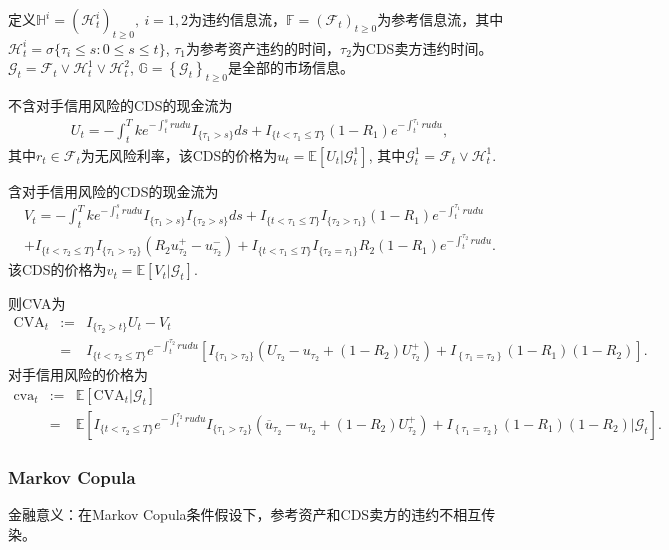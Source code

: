 \documentclass{article}
\begin{document}
  定义$\mathbb{H}^i = (\mathcal{H}_t^i)_{t\ge0},\ i =1,2$为违约信息流，$\mathbb{F} = (\mathcal{F}_t)_{t\ge0}$为参考信息流，其中$\mathcal{H}_t^i = \sigma\{\tau_i\le s:0\le s\le t\}$, $\tau_1$为参考资产违约的时间，$\tau_2$为CDS卖方违约时间。$\mathcal{G}_t = \mathcal{F}_t\vee \mathcal{H}^1_t\vee \mathcal{H}^2_t$, $\mathbb{G} = \left\{\mathcal{G}_t\right\}_{t\ge 0}$是全部的市场信息。
  
  
  不含对手信用风险的CDS的现金流为
\begin{eqnarray}
  U_t = -\int_t^Tke^{-\int_t^srudu} I_{\{\tau_1>s\}}ds +I_{\{t<\tau_1\le T\}}(1-R_1)e^{-\int_t^{\tau_1}rudu},
\end{eqnarray}
其中$r_t\in \mathcal{F}_t$为无风险利率，该CDS的价格为$u_ t = \mathbb{E}[U_t |\mathcal{G}_t^1]$, 其中$\mathcal{G}_t^1 = \mathcal{F}_t\vee \mathcal{H}^1_t$.

  含对手信用风险的CDS的现金流为
  \begin{eqnarray}
    V_t = -\int_t^Tke^{-\int_t^srudu} I_{\{\tau_1>s\}}I_{\{\tau_2>s\}}ds + I_{\{t<\tau_1\le T\}}I_{\{\tau_2>\tau_1\}}(1-R_1)e^{-\int_t^{\tau_1}rudu} \\ + I_{\{t<\tau_2\le T\}}I_{\{\tau_1>\tau_2\}}\left(R_2 u_{\tau_2}^+ -  u_{\tau_2}^-\right) +I_{\{t<\tau_1\le T\}}I_{\{\tau_2=\tau_1\}}R_2(1-R_1)e^{-\int_t^{\tau_2}rudu}.
  \end{eqnarray}
该CDS的价格为$v_ t = \mathbb{E}[V_t |\mathcal{G}_t]$. 

则CVA为
\begin{eqnarray*}
  \text{CVA}_t&:=&I_{\{\tau_2>t\}}U_t - V_t \\
&=& I_{\{t<\tau_2\le T\}}e^{-\int_t^{\tau_2}rudu}\left[I_{\{\tau_1>\tau_2\}}\left(U_{\tau_2} - u_{\tau_2}+(1-R_2)U_{\tau_2}^+\right)+ I_{\left\{\tau_1=\tau_2\right\}}(1-R_1)(1-R_2)\right].
\end{eqnarray*}
对手信用风险的价格为
\begin{eqnarray*}
  \text{cva}_t&:=&\mathbb{E}\left[ \text{CVA}_t |\mathcal{G}_t\right] \\
&=& \mathbb{E} \left[I_{\{t<\tau_2\le T\}}e^{-\int_t^{\tau_2}rudu}I_{\{\tau_1>\tau_2\}}\left(\overline{u}_{\tau_2} - u_{\tau_2}+(1-R_2)U_{\tau_2}^+\right) +I_{\left\{\tau_1=\tau_2\right\}}(1-R_1)(1-R_2) \big| \mathcal{G}_t \right].
\end{eqnarray*}
\subsubsection*{Markov Copula}
金融意义：在Markov Copula条件假设下，参考资产和CDS卖方的违约不相互传染。
\end{document}
